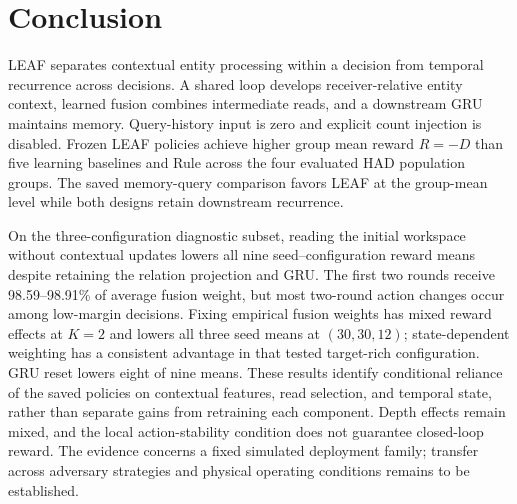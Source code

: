 \section{Conclusion}
LEAF separates contextual entity processing within a decision from temporal recurrence across decisions. A shared loop develops receiver-relative entity context, learned fusion combines intermediate reads, and a downstream GRU maintains memory. Query-history input is zero and explicit count injection is disabled. Frozen LEAF policies achieve higher group mean reward $R=-D$ than five learning baselines and Rule across the four evaluated HAD population groups. The saved memory-query comparison favors LEAF at the group-mean level while both designs retain downstream recurrence.

On the three-configuration diagnostic subset, reading the initial workspace without contextual updates lowers all nine seed--configuration reward means despite retaining the relation projection and GRU. The first two rounds receive 98.59--98.91\% of average fusion weight, but most two-round action changes occur among low-margin decisions. Fixing empirical fusion weights has mixed reward effects at $K=2$ and lowers all three seed means at $(30,30,12)$; state-dependent weighting has a consistent advantage in that tested target-rich configuration. GRU reset lowers eight of nine means. These results identify conditional reliance of the saved policies on contextual features, read selection, and temporal state, rather than separate gains from retraining each component. Depth effects remain mixed, and the local action-stability condition does not guarantee closed-loop reward. The evidence concerns a fixed simulated deployment family; transfer across adversary strategies and physical operating conditions remains to be established.
